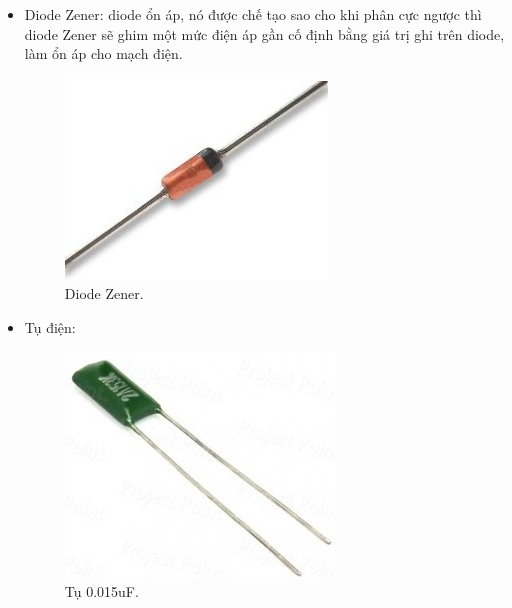 \documentclass[a4paper,12pt,oneside]{article}
\begin{document}
\begin{enumerate}
\begin{itemize}
\item	Diode Zener: diode ổn áp, nó được chế tạo sao cho khi phân cực ngược thì diode Zener sẽ ghim một mức điện áp gần cố định bằng giá trị ghi trên diode, làm ổn áp cho mạch điện.
\begin{figure}[H]
\centering
\includegraphics[scale=.7]{hinh/PPM/ppm_zener.jpg}
\caption{Diode Zener\cite{dientuachau}.}
\end{figure}

\item	Tụ điện:
\begin{figure}[H]
\centering
\includegraphics[scale=.7]{hinh/PPM/ppm_c015.jpg}
\caption{Tụ 0.015uF\cite{dientuachau}.}
\end{figure}


\end{itemize}
\end{enumerate}
\end{document}
